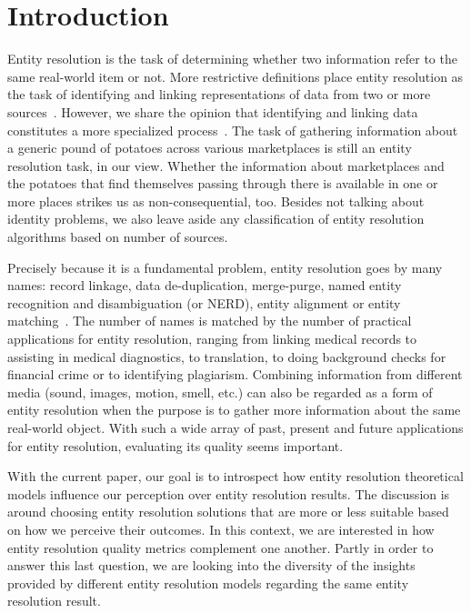 \documentclass[journal]{IEEEtran}
\begin{document}
    \section{Introduction}\label{sec:introduction}
    Entity resolution is the task of determining whether two information refer
    to the same real-world item or not.
    More restrictive definitions place entity resolution as the task of
    identifying and linking representations of data from two or more
    sources~\cite{Qia17}.
    However, we share the opinion that identifying and linking data constitutes
    a more specialized process~\cite{Tal11}.
    The task of gathering information about a generic pound of potatoes across
    various marketplaces is still an entity resolution task, in our view.
    Whether the information about marketplaces and the potatoes that find
    themselves passing through there is available in one or more places strikes
    us as non-consequential, too.
    Besides not talking about identity problems, we also leave aside any
    classification of entity resolution algorithms based on number of sources.
    
    Precisely because it is a fundamental problem, entity resolution goes by
    many names: record linkage, data de-duplication, merge-purge, named entity
    recognition and disambiguation (or NERD), entity alignment or entity
    matching~\cite{Tal11,fever2009,alhelbawy2014}.
    The number of names is matched by the number of practical applications for
    entity resolution, ranging from linking medical records to assisting in
    medical diagnostics, to translation, to doing background checks for
    financial crime or to identifying plagiarism.
    Combining information from different media (sound, images, motion, smell,
    etc.) can also be regarded as a form of entity resolution when the purpose
    is to gather more information about the same real-world object.
    With such a wide array of past, present and future applications for entity
    resolution, evaluating its quality seems important.

    With the current paper, our goal is to introspect how entity resolution
    theoretical models influence our perception over entity resolution results.
    The discussion is around choosing entity resolution solutions that are
    more or less suitable based on how we perceive their outcomes.
    In this context, we are interested in how entity resolution quality metrics
    complement one another.
    Partly in order to answer this last question, we are looking into the
    diversity of the insights provided by different entity resolution models
    regarding the same entity resolution result.
    
\end{document}

